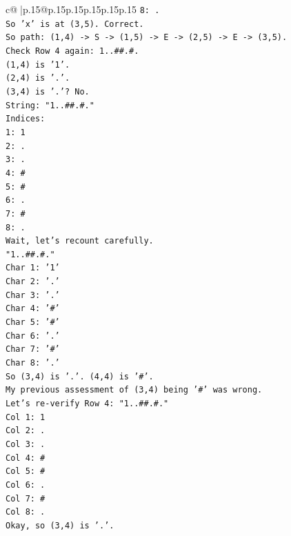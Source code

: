 \documentclass{article}
\begin{document}
{\begin{supertabular}{c@{$\;$}|p{.15\linewidth}@{}p{.15\linewidth}p{.15\linewidth}p{.15\linewidth}p{.15\linewidth}p{.15\linewidth}}
{{{\texttt{8: .} \\
\texttt{So 'x' is at (3,5). Correct.} \\
\texttt{So path: (1,4) {-}> S {-}> (1,5) {-}> E {-}> (2,5) {-}> E {-}> (3,5).} \\
\texttt{Check Row 4 again: 1..\#\#.\#.} \\
\texttt{(1,4) is '1'.} \\
\texttt{(2,4) is '.'.} \\
\texttt{(3,4) is '.'? No.} \\
\texttt{String: "1..\#\#.\#."} \\
\texttt{Indices:} \\
\texttt{1: 1} \\
\texttt{2: .} \\
\texttt{3: .} \\
\texttt{4: \#} \\
\texttt{5: \#} \\
\texttt{6: .} \\
\texttt{7: \#} \\
\texttt{8: .} \\
\texttt{Wait, let's recount carefully.} \\
\texttt{"1..\#\#.\#."} \\
\texttt{Char 1: '1'} \\
\texttt{Char 2: '.'} \\
\texttt{Char 3: '.'} \\
\texttt{Char 4: '\#'} \\
\texttt{Char 5: '\#'} \\
\texttt{Char 6: '.'} \\
\texttt{Char 7: '\#'} \\
\texttt{Char 8: '.'} \\
\texttt{So (3,4) is '.'. (4,4) is '\#'.} \\
\texttt{My previous assessment of (3,4) being '\#' was wrong.} \\
\texttt{Let's re{-}verify Row 4: "1..\#\#.\#."} \\
\texttt{Col 1: 1} \\
\texttt{Col 2: .} \\
\texttt{Col 3: .} \\
\texttt{Col 4: \#} \\
\texttt{Col 5: \#} \\
\texttt{Col 6: .} \\
\texttt{Col 7: \#} \\
\texttt{Col 8: .} \\
\texttt{Okay, so (3,4) is '.'.} \\
}}}
\end{supertabular}}
\end{document}
